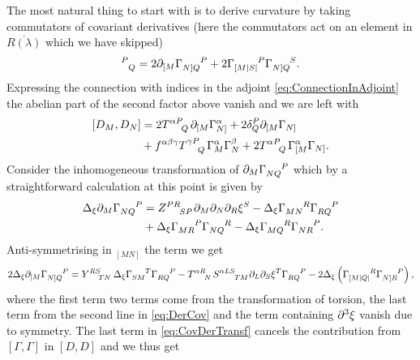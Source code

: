 The most natural thing to start with is to derive curvature by taking commutators of covariant derivatives (here the commutators act on an element in $\overbar{R(\lambda)}$ which we have skipped)
\begin{equation}
    [D_M,D_N]\tensor{}{^P_Q} = 2\pd_{[M}\tensor{\Gamma}{_{N]Q}^P}+2\tensor{\Gamma}{_{[M|S|}^P}\tensor{\Gamma}{_{N]Q}^S}.
\end{equation}
Expressing the connection with indices in the adjoint \eqref{eq:ConnectionInAdjoint} the abelian part of the second factor above vanish and we are left with 
\begin{equation}
    \begin{aligned}
        [D_M,D_N] &= 2\tensor{T}{^{\alpha P}_Q}\pd_{[M}\Gamma_{N]}^\alpha+2\delta^P_Q\pd_{[M}\Gamma_{N]}\\
        &+\tensor{f}{^{\alpha\beta\gamma}}\tensor{T}{^{\gamma P}_Q}\Gamma_M^\alpha\Gamma_N^\beta+2\tensor{T}{^{\alpha P}_Q}\Gamma^\alpha_{[M}\Gamma_{N]}.
    \end{aligned}
\end{equation}
Consider the inhomogeneous transformation of $\pd_M\tensor{\Gamma}{_{NQ}^P}$ which by a straightforward calculation at this point is given by 
\begin{equation}\label{eq:DerCov}
    \begin{aligned}
        \Delta_\xi \pd_M\tensor{\Gamma}{_{NQ}^P} &= \tensor{Z}{^{PR}_{SP}}\pd_M\pd_N\pd_R\xi^S-\Delta_\xi \tensor{\Gamma}{_{MN}^R}\tensor{\Gamma}{_{RQ}^P}\\
        &+\Delta_\xi \tensor{\Gamma}{_{MR}^P}\tensor{\Gamma}{_{NQ}^R}-\Delta_\xi \tensor{\Gamma}{_{MQ}^R}\tensor{\Gamma}{_{NR}^P}.
    \end{aligned}
\end{equation}
Anti-symmetrising in $_{[MN]}$ the term we get 
\begin{equation}\label{eq:CovDerTransf}
    \begin{aligned}
        2\Delta_\xi\pd_{[M}\tensor{\Gamma}{_{N]Q}^P} = \tensor{Y}{^{RS}_{TN}}\Delta_\xi \tensor{\Gamma}{_{SM}^T}\tensor{\Gamma}{_{RQ}^P}-\tensor{T}{^{\alpha R}_N}\tensor{S}{^{\alpha LS}_{TM}}\pd_L\pd_S\xi^T\tensor{\Gamma}{_{RQ}^P}-2\Delta_\xi\left(\tensor{\Gamma}{_{[M|Q|}^R}\tensor{\Gamma}{_{N]R}^P}\right),
    \end{aligned}
\end{equation}
where the first term two terms come from the transformation of torsion, the last term from the second line in \eqref{eq:DerCov} and the term containing $\partial^3\xi$ vanish due to symmetry. The last term in \eqref{eq:CovDerTransf} cancels the contribution from $[\Gamma,\Gamma]$ in $[D,D]$ and we thus get 
